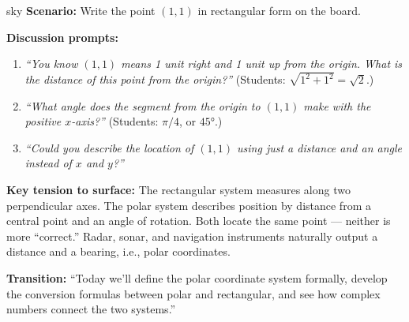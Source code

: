 \documentclass[10pt]{article}
\begin{document}
\begin{skillbox}{sky}
\textbf{Scenario:} Write the point $(1,1)$ in rectangular form on the board.

\textbf{Discussion prompts:}
\begin{enumerate}[leftmargin=1.4em, itemsep=3pt]
  \item \textit{``You know $(1,1)$ means 1 unit right and 1 unit up from the
    origin. What is the \emph{distance} of this point from the origin?''}
    (Students: $\sqrt{1^2+1^2} = \sqrt{2}$.)
  \item \textit{``What \emph{angle} does the segment from the origin to $(1,1)$
    make with the positive $x$-axis?''} (Students: $\pi/4$, or $45°$.)
  \item \textit{``Could you describe the location of $(1,1)$ using just a
    distance and an angle instead of $x$ and $y$?''}
\end{enumerate}

\textbf{Key tension to surface:} The rectangular system measures along two
perpendicular axes. The polar system describes position by distance from a
central point and an angle of rotation. Both locate the same point --- neither
is more ``correct.'' Radar, sonar, and navigation instruments naturally output
a distance and a bearing, i.e., polar coordinates.

\textbf{Transition:} ``Today we'll define the polar coordinate system formally,
develop the conversion formulas between polar and rectangular, and see how
complex numbers connect the two systems.''
\end{skillbox}

\vspace{0.08in}
\end{document}
